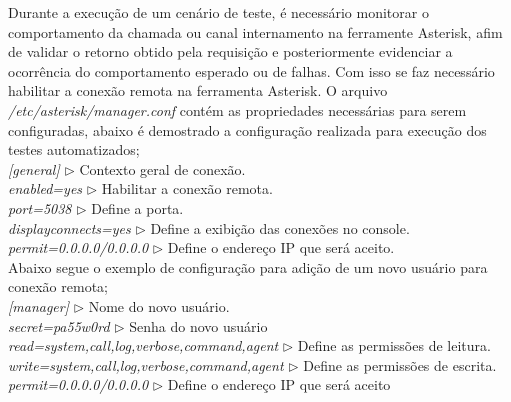 Durante a execução de um cenário de teste, é necessário monitorar o comportamento da chamada ou canal internamento na ferramente Asterisk,
afim de validar o retorno obtido pela requisição e posteriormente evidenciar a ocorrência do comportamento esperado ou de falhas. Com isso se faz necessário habilitar a conexão remota na ferramenta Asterisk. O arquivo \textit{/etc/asterisk/manager.conf} contém as propriedades necessárias para serem configuradas, abaixo é demostrado a configuração realizada para execução dos testes automatizados;
\\
\hspace{10 mm}\textit{[general]} 			\hspace{10 mm} $\triangleright$ Contexto geral de conexão.\\
\hspace{10 mm}\textit{enabled=yes}  		\hspace{10 mm} $\triangleright$ Habilitar a conexão remota.\\
\hspace{10 mm}\textit{port=5038}  			\hspace{10 mm} $\triangleright$ Define a porta.\\
\hspace{10 mm}\textit{displayconnects=yes}  \hspace{10 mm} $\triangleright$ Define a exibição das conexões no console.\\
\hspace{10 mm}\textit{permit=0.0.0.0/0.0.0.0} \hspace{10 mm} $\triangleright$ Define o endereço IP que será aceito.\\

Abaixo segue o exemplo de configuração para adição de um novo usuário para conexão remota;
\\
\hspace{10 mm}\textit{[manager]} 	\hspace{10 mm} $\triangleright$ Nome do novo usuário.\\
\hspace{10 mm}\textit{secret=pa55w0rd} \hspace{10 mm} $\triangleright$ Senha do novo usuário \\
\hspace{10 mm}\textit{read=system,call,log,verbose,command,agent}  \hspace{10 mm} $\triangleright$ Define as permissões de leitura.\\
\hspace{10 mm}\textit{write=system,call,log,verbose,command,agent}  \hspace{10 mm} $\triangleright$ Define as permissões de escrita.\\
\hspace{10 mm}\textit{permit=0.0.0.0/0.0.0.0} \hspace{10 mm} $\triangleright$ Define o endereço IP que será aceito \\


